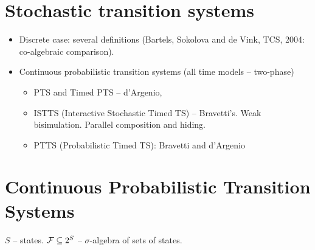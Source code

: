 \begin{slide}
\newslide\section*{Stochastic transition systems}
\begin{itemize}
\item Discrete case: several definitions (Bartels, Sokolova and de Vink, TCS, 2004: co-algebraic comparison).
\pause
\item Continuous probabilistic transition systems (all time models -- two-phase)
  \begin{itemize}
  \item PTS and Timed PTS -- d'Argenio, 
  \item ISTTS (Interactive Stochastic Timed TS) -- Bravetti's. Weak bisimulation. Parallel composition and hiding.
  \item PTTS (Probabilistic Timed TS): Bravetti and d'Argenio
  \end{itemize}
\end{itemize}
\newslide\section*{Continuous Probabilistic Transition Systems}
$S$ -- states. ${\cal F}\subseteq 2^S$ -- $\sigma$-algebra of sets of states. 


\end{slide}
